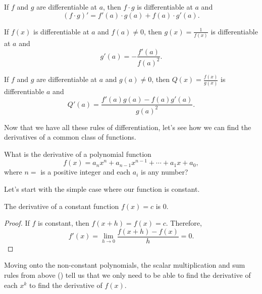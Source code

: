 \begin{thm}
	If $f$ and $g$ are differentiable at $a$, then $f\cdot g$ is differentiable at $a$ and \begin{equation}
		(f\cdot g)'=f'(a)\cdot g(a)+f(a)\cdot g'(a).
	\end{equation}
\end{thm}

\begin{thm}
If $f(x)$ is differentiable at $a$ and $f(a)\neq 0$, then $g(x)=\frac{1}{f(x)}$ is differentiable at $a$ and
\begin{equation}
g'(a)=-\frac{f'(a)}{f(a)^2}.
\end{equation}
\end{thm}

\begin{cor}
	If $f$ and $g$ are differentiable at $a$ and $g(a)\neq 0$, then $Q(x)=\frac{f(x)}{g(x)}$ is differentiable $a$ and
	\begin{equation}
		Q'(a)=\frac{f'(a)g(a)-f(a)g'(a)}{g(a)^2}.
	\end{equation}
\end{cor}


Now that we have all these rules of differentiation, let's see how we can find the derivatives of a common class of functions.

\begin{quest}
	What is the derivative of a polynomial function
	\begin{equation}
		f(x)=a_nx^n+a_{n-1}x^{n-1}+\dotsb+ a_1x+a_0,
	\end{equation}
	where $n=$ is a positive integer and each $a_i$ is any number?
\end{quest}

Let's start with the simple case where our function is constant.

\begin{prop}
The derivative of a constant function $f(x) =c$ is 0.
\end{prop}

\begin{proof}
If $f$ is constant, then $f(x + h) = f(x) = c$. Therefore,
\[
f'(x) = \lim\limits_{h\to 0} \frac{f(x+h)-f(x)}{h} = 0.
\]
\end{proof}

Moving onto the non-constant polynomials, the scalar multiplication and sum rules from above (\label{SMultSumDiff}) tell us that we only need to be able to find the derivative of each $x^k$ to find the derivative of $f(x)$.


